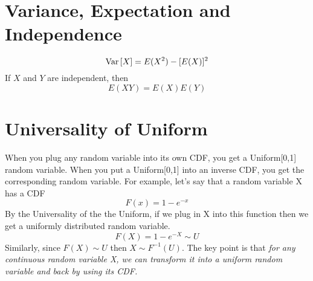 \documentclass[11pt]{article}
\theoremstyle{definition}
\theoremstyle{remark}
\renewcommand{\var}[1]{\textnormal{Var}\left[ #1 \right]}
\begin{document}

\section{Variance, Expectation and Independence}
\[\var X = E(X^2) - [E(X)]^2\]
If $X$ and $Y$ are independent, then
\[E(XY) = E(X)E(Y)\]


\section{Universality of Uniform} When you plug any random variable into its own CDF, you get a Uniform[0,1] random variable. When you put a Uniform[0,1] into an inverse CDF, you get the corresponding random variable. For example, let's say that a random variable X has a CDF
	\[ F(x) = 1 - e^{-x} \]
	By the Universality of the the Uniform, if we plug in X into this function then we get a uniformly distributed random variable.
	\[ F(X) = 1 - e^{-X} \sim U\]
	Similarly, since $F(X) \sim U$ then $X \sim F^{-1}(U)$. The key point is that \emph{for any continuous random variable X, we can transform it into a uniform random variable and back by using its CDF.}
\end{document}
